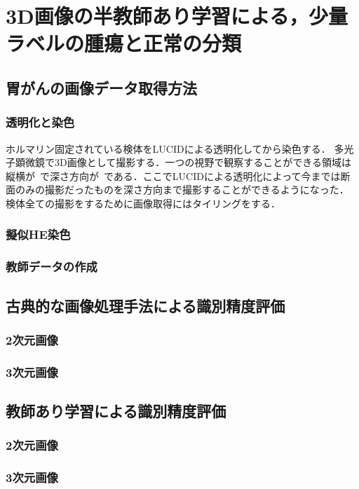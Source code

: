 \chapter{3D画像の半教師あり学習による，少量ラベルの腫瘍と正常の分類}

\section{胃がんの画像データ取得方法}

\subsection{透明化と染色}
ホルマリン固定されている検体をLUCIDによる透明化してから染色する．
多光子顕微鏡で3D画像として撮影する．一つの視野で観察することができる領域は縦横が~で深さ方向が~である．ここでLUCIDによる透明化によって今までは断面のみの撮影だったものを深さ方向まで撮影することができるようになった．
検体全ての撮影をするために画像取得にはタイリングをする．

\subsection{擬似HE染色}

\subsection{教師データの作成}

\section{古典的な画像処理手法による識別精度評価}
\subsection*{2次元画像}
\subsection*{3次元画像}

\section{教師あり学習による識別精度評価}
\subsection*{2次元画像}
\subsection*{3次元画像}

